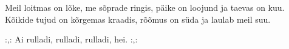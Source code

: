 Meil loitmas on l\~oke, me s\~oprade ringis,
p\"aike on loojund ja taevas on kuu.
K\~oikide tujud on k\~orgemas kraadis,
r\~o\~omus on s\"uda ja laulab meil suu.

:,: Ai rulladi, rulladi, rulladi, hei. :,: